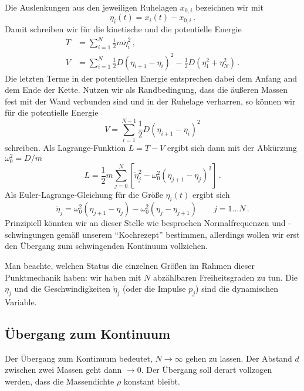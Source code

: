 \documentclass[paper=a4, fontsize=11.0pt, abstractoff, DIV12]{scrartcl}
\begin{document}
Die Auslenkungen aus den jeweiligen Ruhelagen $x_{0,i}$ bezeichnen wir mit
\begin{equation}
\eta_i(t) = x_i(t) - x_{0,i}\,.
\end{equation}
Damit schreiben wir für die kinetische und die potentielle Energie
\begin{align}
T &= \sum\limits_{i=1}^{N} \frac{1}{2}m\dot{\eta}_{i}^2\,,\\
V &= \sum\limits_{i=1}^{N} \frac{1}{2}D\left(\eta_{i+1}-\eta_i\right)^2-\frac{1}{2}D\left(\eta_1^2+\eta_N^2\right)\,.
\end{align}
Die letzten Terme in der potentiellen Energie entsprechen dabei dem Anfang
and dem Ende der Kette. Nutzen wir als Randbedingung, dass die äußeren Massen
fest mit der Wand verbunden sind und in der Ruhelage verharren, so können wir
für die potentielle Energie
\begin{equation}
V = \sum\limits_{i=1}^{N-1} \frac{1}{2}D\left(\eta_{i+1}-\eta_i\right)^2
\end{equation}
schreiben. Als Lagrange-Funktion $L=T-V$ ergibt sich dann mit der Abkürzung
$\omega_0^2 = D/m$
\begin{equation}
L =\frac{1}{2}m\sum\limits_{j=0}^{N}\left[\dot{\eta}_j^2 -\omega_0^2(\eta_{j+1}-\eta_j)^2 \right]\,.
\end{equation}
Als Euler-Lagrange-Gleichung für die Größe $\eta_i(t)$ ergibt sich
\begin{equation}
\ddot{\eta}_j =\omega_0^2(\eta_{j+1}-\eta_j) - \omega_0^2(\eta_{j}-\eta_{j+1})\qquad j=1\dots N\,.
\label{eq:BewGl}
\end{equation}
Prinzipiell könnten wir an dieser Stelle wie besprochen Normalfrequenzen und
-schwingungen gemäß unserem ``Kochrezept'' bestimmen, allerdings wollen wir
erst den Übergang zum schwingenden Kontinuum vollziehen.

Man beachte, welchen Status die einzelnen Größen im Rahmen dieser
Punktmechanik haben: wir haben mit $N$ abzählbaren Freiheitsgraden zu tun.
Die $\eta_j$ und die Geschwindigkeiten $\dot\eta_j$ (oder die Impulse $p_j$)
sind die dynamischen Variable.

\subsection{Übergang zum Kontinuum}

Der Übergang zum Kontinuum bedeutet, $N\to\infty$ gehen zu lassen. Der
Abstand $d$ zwischen zwei Massen geht dann $\to 0$. Der Übergang soll derart
vollzogen werden, dass die Massendichte $\rho$ konstant bleibt.
\end{document}
